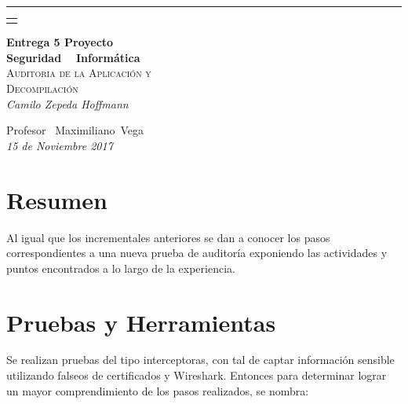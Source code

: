 \documentclass[a4paper,11pt]{article}
\theoremstyle{mytheor}
\begin{document}
\begin{titlepage} %
	
	\raggedleft %
	
	\rule{1pt}{\textheight} %
	\hspace{0.05\textwidth} %
	\parbox[b]{0.75\textwidth}{ %
	 \begin{tabularx}{\linewidth}{}
     \end{tabularx}
     \bigskip
     \vfill
		{\Huge\bfseries Entrega \textnumero{} 5 Proyecto\\[0.5\baselineskip] Seguridad ~ Informática}\\[2\baselineskip] %
		{\large\textsc{Auditoria de la Aplicación y}}\\
		{\large\textsc{Decompilación }}\\[1\baselineskip] %
		{\normalsize\textit{Camilo Zepeda Hoffmann}} %
		
		\vspace{0.5\textheight} %
		
		{\noindent Profesor~ Maximiliano~Vega\plogo}\\[\baselineskip] %
		{\normalsize\textit{15 de Noviembre 2017}}
	}

\end{titlepage}


\section{Resumen}

Al igual que los incrementales anteriores se dan a conocer los pasos correspondientes a una nueva prueba de auditoría exponiendo las actividades y puntos encontrados a lo largo de la experiencia.



\section{Pruebas y Herramientas}
Se realizan pruebas del tipo interceptoras, con tal de captar información sensible utilizando falseos de certificados y Wireshark. 
Entonces para determinar lograr un mayor comprendimiento de los pasos realizados, se nombra:
\end{document}
